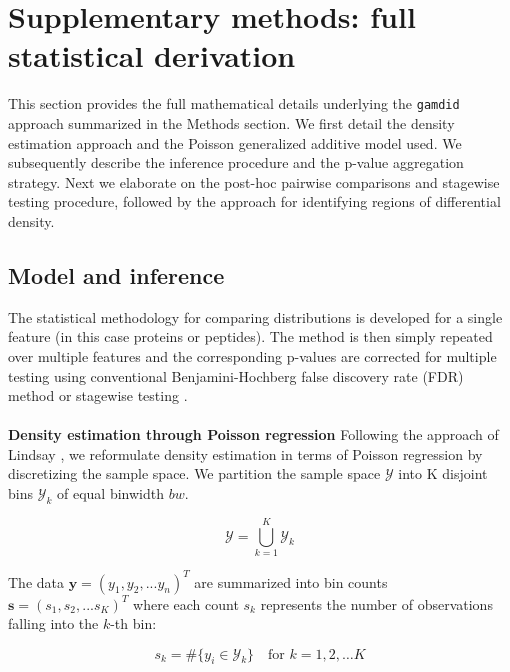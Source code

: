 
\section{Supplementary methods: full statistical derivation} \label{suppl_methods}

This section provides the full mathematical details underlying the \texttt{gamdid} approach summarized in the Methods section. We first detail the density estimation approach and the Poisson generalized additive model used. We subsequently describe the inference procedure and the p-value aggregation strategy. Next we elaborate on the post-hoc pairwise comparisons and stagewise testing procedure, followed by the approach for identifying regions of differential density.

\subsection{Model and inference}

The statistical methodology for comparing distributions is developed for a single feature (in this case proteins or peptides). The method is then simply repeated over multiple features and the corresponding p-values are corrected for multiple testing using conventional Benjamini-Hochberg false discovery rate (FDR) method \cite{BH_procedure} or stagewise testing \cite{stagewise_testing}.
\\
\\
\textbf{Density estimation through Poisson regression} Following the approach of Lindsay \cite{lindsay_method}, we reformulate density estimation in terms of Poisson regression by discretizing the sample space. We partition the sample space $\mathscr{Y}$ into K disjoint bins $\mathscr{Y}_k$ of equal binwidth $bw$.

\begin{equation}
	\mathscr{Y} =\bigcup_{k=1}^K \mathscr{Y}_k
	\label{eq:discr}
\end{equation}

The data $\boldsymbol{y} = (y_1,y_2, ... y_n)^T$ are summarized into bin counts $\boldsymbol{s} = (s_1,s_2, ... s_K)^T$ where each count $s_k$ represents the number of observations falling into the $k$-th bin:

\begin{equation}
    s_k = \# \{ y_i \in \mathscr{Y}_k \}\quad 
    \text{for } k=1,2, \ldots K
	\label{eq:binning}
\end{equation}

